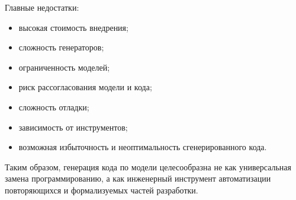 \documentclass[12pt,a4paper]{article}
\begin{document}
Главные недостатки:

\begin{itemize}
    \item высокая стоимость внедрения;
    \item сложность генераторов;
    \item ограниченность моделей;
    \item риск рассогласования модели и кода;
    \item сложность отладки;
    \item зависимость от инструментов;
    \item возможная избыточность и неоптимальность сгенерированного кода.
\end{itemize}

Таким образом, генерация кода по модели целесообразна не как универсальная замена программированию, а как инженерный инструмент автоматизации повторяющихся и формализуемых частей разработки.
\end{document}

